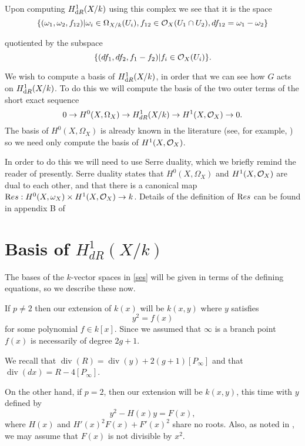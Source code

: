 \documentclass[draft, 11pt]{article} %
\theoremstyle{plain}
\theoremstyle{remark}
\newcommand{\cO}{{\cal O}}
\newcommand{\ra}{\rightarrow}
\DeclareMathOperator{\di}{div}
\begin{document}
Upon computing $H^1_{{\text dR}}(X/k)$ using this complex we see that it is the space
\begin{equation}\label{derhamconditions}
\{(\omega_1, \omega_2, f_{12}) | \omega_i\in \Omega_{X/k}(U_i), f_{12}\in \cO_X(U_1 \cap U_2), df_{12} = \omega_1 - \omega_2\}
\end{equation}

quotiented by the subspace
\[
\{ (df_1, df_2, f_1-f_2)|f_i \in \cO_X(U_i)\}.
\]

We wish to compute a basis of $H^1_{{\text dR}}(X/k)$, in order that we can see how $G$ acts on $H^1_{{\text dR}}(X/k)$.
To do this we will compute the basis of the two outer terms of the short exact sequence
\begin{equation}\label{ses}
0 \ra H^0(X,\Omega_X) \ra H^1_{dR}(X/k) \ra H^1(X,\cO_X) \ra 0.
\end{equation}
The basis of $H^0(X,\Omega_X)$ is already known in the literature (see, for example, \cite[Prop. 7.4.26]{liu}) so we need only compute the basis of $H^1(X,\cO_X)$.

In order to do this we will need to use Serre duality, which we briefly remind the reader of presently.
Serre duality states that $H^0(X,\Omega_X)$ and $H^1(X,\cO_X)$ are dual to each other, and that there is a canonical map ${\text Res}:H^0(X,\omega_X) \times H^1(X,\cO_X) \rightarrow k$.
Details of the definition of ${\text Res}$ can be found in appendix B of 

\section{Basis of $H^1_{dR}(X/k)$}

The bases of the $k$-vector spaces in \ref{ses} will be given in terms of the defining equations, so we describe these now.

If $p \neq 2$ then our extension of $k(x)$ will be $k(x,y)$ where $y$ satisfies
\[
y^2 = f(x)
\]
for some polynomial $f \in k[x]$.
Since we assumed that $\infty$ is a branch point $f(x)$ is necessarily of degree $2g+1$.

We recall that $\di (R) = \di(y) + 2(g+1)[P_\infty]$ and that $\di( dx) = R - 4[P_\infty]$.

On the other hand, if $p=2$, then our extension will be $k(x,y)$, this time with $y$ defined by
\[
y^2 - H(x)y = F(x),
\]
where $H(x)$ and $H'(x)^2F(x) + F'(x)^2$ share no roots.
Also, as noted in \cite[\S 6]{faithfulaction}, we may assume that $F(x)$ is not divisible by $x^2$.
\end{document}
